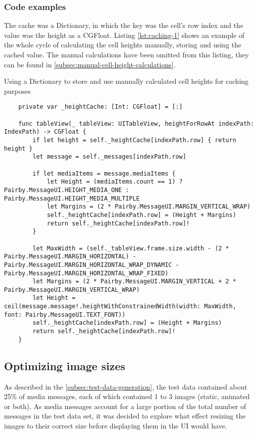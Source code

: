 \documentclass[a4paper,12pt]{article}
\begin{document}
\subsubsection{Code examples}
The cache was a Dictionary, in which the key was the cell's row index and the value was the height as a CGFloat. Listing \autoref{lst:caching-1} shows an example of the whole cycle of calculating the cell heights manually, storing and using the cached value. The manual calculations have been omitted from this listing, they can be found in \autoref{subsec:manual-cell-height-calculations}. 
\begin{listing}[H]
  \caption{Using a Dictionary to store and use manually calculated cell heights for caching purposes}
  \label{lst:caching-1}
  \begin{verbatim}
    private var _heightCache: [Int: CGFloat] = [:]

    func tableView(_ tableView: UITableView, heightForRowAt indexPath: IndexPath) -> CGFloat {
        if let height = self._heightCache[indexPath.row] { return height }
        let message = self._messages[indexPath.row]

        if let mediaItems = message.mediaItems {
            let Height = (mediaItems.count == 1) ? Pairby.MessageUI.HEIGHT_MEDIA_ONE : Pairby.MessageUI.HEIGHT_MEDIA_MULTIPLE
            let Margins = (2 * Pairby.MessageUI.MARGIN_VERTICAL_WRAP)
            self._heightCache[indexPath.row] = (Height + Margins)
            return self._heightCache[indexPath.row]!
        }

        let MaxWidth = (self._tableView.frame.size.width - (2 * Pairby.MessageUI.MARGIN_HORIZONTAL) - Pairby.MessageUI.MARGIN_HORIZONTAL_WRAP_DYNAMIC - Pairby.MessageUI.MARGIN_HORIZONTAL_WRAP_FIXED)
        let Margins = (2 * Pairby.MessageUI.MARGIN_VERTICAL + 2 * Pairby.MessageUI.MARGIN_VERTICAL_WRAP)
        let Height = ceil(message.message!.heightWithConstrainedWidth(width: MaxWidth, font: Pairby.MessageUI.TEXT_FONT))
        self._heightCache[indexPath.row] = (Height + Margins)
        return self._heightCache[indexPath.row]!
    }
  \end{verbatim}
\end{listing}


\subsection{Optimizing image sizes}
\label{subsec:optimizing-image-sizes}
As described in the \autoref{subsec:test-data-generation}, the test data contained about 25\% of media messages, each of which contained 1 to 3 images (static, animated or both). As media messages account for a large portion of the total number of messages in the test data set, it was decided to explore what effect resizing the images to their correct size before displaying them in the UI would have.
\end{document}
